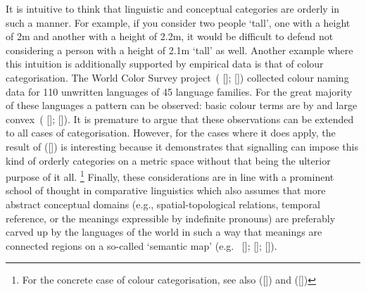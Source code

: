 \documentclass[12pt,english]{article}
\numberwithin{equation}{section}
\newcommand{\citetbjps}[1]{\citeauthor{#1} ([\citeyear{#1}])}
\newcommand{\citealtbjps}[1]{\citeauthor{#1} [\citeyear{#1}]}
\begin{document}
It is intuitive to think that linguistic and conceptual categories are orderly in such a
manner.  For example, if you consider two people `tall', one with a height of 2m and another with a
height of 2.2m, it would be difficult to defend not considering a person with a height
of 2.1m `tall' as well. Another example where this intuition is additionally supported by empirical data is that of colour categorisation. The World Color Survey
project~(\citealtbjps{CookKay2005:The-World-Color}; \citealtbjps{WCS}) collected colour naming data for 110 unwritten
languages of 45 language families.  For the great majority of these languages a pattern can be
observed: basic colour terms are by and large convex~(\citealtbjps{Regier07}; \citealtbjps{Jager2010}). It
is premature to argue that these observations can be extended to all cases of
categorisation. However, for the cases where it does apply, the result of
\citetbjps{JagerMetzger2011:Voronoi-Languag} is interesting because it demonstrates that signalling
can impose this kind of orderly categories on a metric space without that being the ulterior
purpose of it all.%
\footnote{For the concrete case of colour categorisation, see also
  \citetbjps{JagerRooijvan-Rooij2007:Language-Struct} and \citetbjps{Correia2015}}
Finally, these considerations are in line with a prominent
school of thought in comparative linguistics which also assumes that more abstract conceptual domains
(e.g., spatial-topological relations, temporal reference, or the meanings expressible by
indefinite pronouns) are preferably carved up by the languages of the world in such a way
that meanings are connected regions on a so-called `semantic map'
(e.g.~\citealtbjps{Croft2003:Typology-and-Un}; \citealtbjps{Haspelmath2003:The-geometry-of}; \citealtbjps{LevinsonMeira2003:Natural-concept}).
\end{document}
